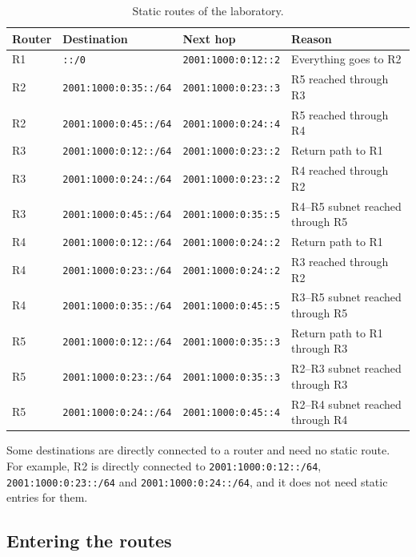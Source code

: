 \begin{table}[h]
\centering
\begin{tabular}{@{}lllp{5.8cm}@{}}
\toprule
\textbf{Router} & \textbf{Destination} & \textbf{Next hop} & \textbf{Reason} \\
\midrule
R1 & \texttt{::/0} & \texttt{2001:1000:0:12::2} & Everything goes to R2 \\
\midrule
R2 & \texttt{2001:1000:0:35::/64} & \texttt{2001:1000:0:23::3} & R5 reached through R3 \\
R2 & \texttt{2001:1000:0:45::/64} & \texttt{2001:1000:0:24::4} & R5 reached through R4 \\
\midrule
R3 & \texttt{2001:1000:0:12::/64} & \texttt{2001:1000:0:23::2} & Return path to R1 \\
R3 & \texttt{2001:1000:0:24::/64} & \texttt{2001:1000:0:23::2} & R4 reached through R2 \\
R3 & \texttt{2001:1000:0:45::/64} & \texttt{2001:1000:0:35::5} & R4--R5 subnet reached through R5 \\
\midrule
R4 & \texttt{2001:1000:0:12::/64} & \texttt{2001:1000:0:24::2} & Return path to R1 \\
R4 & \texttt{2001:1000:0:23::/64} & \texttt{2001:1000:0:24::2} & R3 reached through R2 \\
R4 & \texttt{2001:1000:0:35::/64} & \texttt{2001:1000:0:45::5} & R3--R5 subnet reached through R5 \\
\midrule
R5 & \texttt{2001:1000:0:12::/64} & \texttt{2001:1000:0:35::3} & Return path to R1 through R3 \\
R5 & \texttt{2001:1000:0:23::/64} & \texttt{2001:1000:0:35::3} & R2--R3 subnet reached through R3 \\
R5 & \texttt{2001:1000:0:24::/64} & \texttt{2001:1000:0:45::4} & R2--R4 subnet reached through R4 \\
\bottomrule
\end{tabular}
\caption{Static routes of the laboratory.}
\label{tab:lab01-routes}
\end{table}

Some destinations are directly connected to a router and need no static route. For example, R2 is directly connected to \texttt{2001:1000:0:12::/64}, \texttt{2001:1000:0:23::/64} and \texttt{2001:1000:0:24::/64}, and it does not need static entries for them.

\subsection{Entering the routes}

